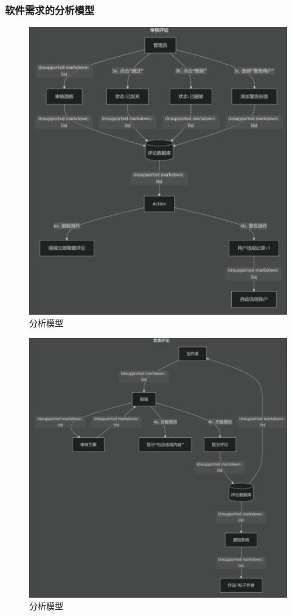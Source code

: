 \documentclass{base}
\begin{document}
\subsubsection{软件需求的分析模型}

\begin{figure}[H]
    \centering
    \includegraphics[width=\textwidth]{images/4-1.png}
    \caption{分析模型}
\end{figure}
\begin{figure}[H]
    \centering
    \includegraphics[width=\textwidth]{images/4-2.png}
    \caption{分析模型}
\end{figure}
\end{document}
